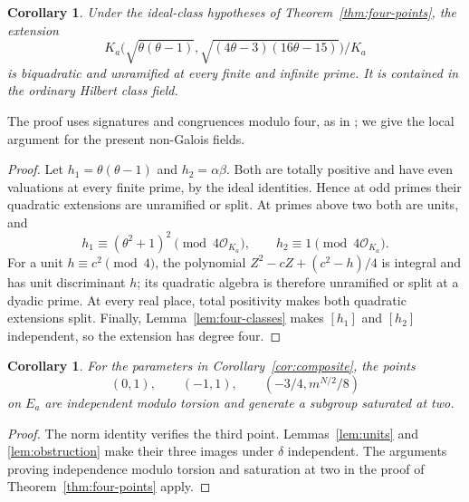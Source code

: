 \documentclass[draft]{publmathdeb}
\newtheorem{corollary}[theorem]{Corollary}
\theoremstyle{remark}
\numberwithin{equation}{section}
\begin{document}
\begin{samepage}
  \begin{corollary}\label{cor:hilbert}
    Under the ideal-class hypotheses of Theorem~\ref{thm:four-points}, the extension
    \[
      K_a\bigl(\sqrt{\theta(\theta-1)},\sqrt{(4\theta-3)(16\theta-15)}\bigr)/K_a
    \]
    is biquadratic and unramified at every finite and infinite prime. It is contained in the ordinary Hilbert class field.
  \end{corollary}
\end{samepage}

The proof uses signatures and congruences modulo four, as in \cite[\S I.6(b--c) and Proposition I.5]{GrasGras1975}; we give the local argument for the present non-Galois fields.

\begin{proof}
  Let $h_1=\theta(\theta-1)$ and $h_2=\alpha\beta$. Both are totally positive and have even valuations at every finite prime, by the ideal identities. Hence at odd primes their quadratic extensions are unramified or split. At primes above two both are units, and
  \[
    h_1\equiv(\theta^2+1)^2\pmod{4\mathcal O_{K_a}},\qquad
    h_2\equiv1\pmod{4\mathcal O_{K_a}}.
  \]
  For a unit $h\equiv c^2\pmod4$, the polynomial $Z^2-cZ+(c^2-h)/4$ is integral and has unit discriminant $h$; its quadratic algebra is therefore unramified or split at a dyadic prime. At every real place, total positivity makes both quadratic extensions split. Finally, Lemma~\ref{lem:four-classes} makes $[h_1]$ and $[h_2]$ independent, so the extension has degree four.
\end{proof}

\begin{samepage}
  \begin{corollary}\label{cor:three-points}
    For the parameters in Corollary~\ref{cor:composite}, the points
    \[
      (0,1),\qquad (-1,1),\qquad (-3/4,m^{N/2}/8)
    \]
    on $E_a$ are independent modulo torsion and generate a subgroup saturated at two.
  \end{corollary}
\end{samepage}

\begin{proof}
  The norm identity verifies the third point. Lemmas~\ref{lem:units} and \ref{lem:obstruction} make their three images under $\delta$ independent. The arguments proving independence modulo torsion and saturation at two in the proof of Theorem~\ref{thm:four-points} apply.
\end{proof}
\end{document}
